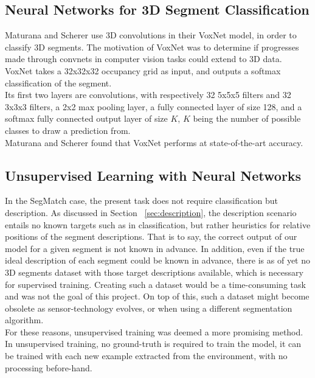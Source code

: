 \subsection{Neural Networks for 3D Segment Classification}
\label{subsec:voxnet}

Maturana and Scherer \cite{voxnet} use 3D convolutions in their VoxNet model, in order to classify 3D segments. The motivation of VoxNet was to determine if progresses made through convnets in computer vision tasks could extend to 3D data.\\

VoxNet takes a 32x32x32 occupancy grid as input, and outputs a softmax classification of the segment.\\

Its first two layers are convolutions, with respectively 32 5x5x5 filters and 32 3x3x3 filters, a 2x2 max pooling layer, a fully connected layer of size 128, and a softmax fully connected output layer of size $K$, $K$ being the number of possible classes to draw a prediction from.\\

Maturana and Scherer found that VoxNet performs at state-of-the-art accuracy.


\subsection{Unsupervised Learning with Neural Networks}
\label{subsec:autoencoder}

In the SegMatch case, the present task does not require classification but description. As discussed in Section ~\ref{sec:description}, the description scenario entails no known targets such as in classification, but rather heuristics for relative positions of the segment descriptions. That is to say, the correct output of our model for a given segment is not known in advance. In addition, even if the true ideal description of each segment could be known in advance, there is as of yet no 3D segments dataset with those target descriptions available, which is necessary for supervised training. Creating such a dataset would be a time-consuming task and was not the goal of this project. On top of this, such a dataset might become obsolete as sensor-technology evolves, or when using a different segmentation algorithm.\\

For these reasons, unsupervised training was deemed a more promising method. In unsupervised training, no ground-truth is required to train the model, it can be trained with each new example extracted from the environment, with no processing before-hand.\\

